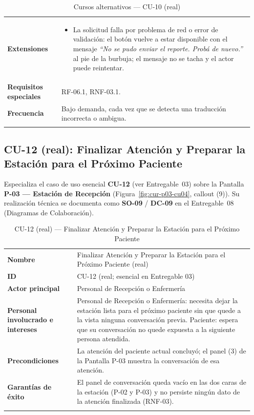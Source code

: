 \begin{longtable}{@{}p{4.1cm} >{\raggedright\arraybackslash}p{11.2cm}@{}}
\toprule
\textbf{Extensiones} &
\begin{itemize}[leftmargin=*, itemsep=2pt]
    \item[2a.] La solicitud falla por problema de red o error de validación:
    el botón vuelve a estar disponible con el mensaje \textit{``No se pudo
    enviar el reporte. Probá de nuevo.''} al pie de la burbuja; el mensaje
    no se tacha y el actor puede reintentar.
\end{itemize} \\
\textbf{Requisitos especiales} & RF-06.1, RNF-03.1. \\
\textbf{Frecuencia} &
Bajo demanda, cada vez que se detecta una traducción incorrecta o
ambigua. \\
\bottomrule
\caption{Cursos alternativos --- CU-10 (real)}
\end{longtable}

\subsection{CU-12 (real): Finalizar Atención y Preparar la Estación para el
Próximo Paciente}

Especializa el caso de uso esencial \textbf{CU-12} (ver Entregable~03) sobre
la Pantalla \textbf{P-03 --- Estación de Recepción}
(Figura~\ref{fig:cur-p03-cu04}, callout (9)). Su realización técnica se
documenta como \textbf{SO-09} / \textbf{DC-09} en el Entregable~08
(Diagramas de Colaboración).

\begin{longtable}{@{}p{4.1cm} >{\raggedright\arraybackslash}p{11.2cm}@{}}
\toprule
\textbf{Nombre} & Finalizar Atención y Preparar la Estación para el Próximo
Paciente (real) \\
\textbf{ID} & CU-12 (real; esencial en Entregable 03) \\
\textbf{Actor principal} & Personal de Recepción o Enfermería \\
\textbf{Personal involucrado e intereses} &
Personal de Recepción o Enfermería: necesita dejar la estación lista para
el próximo paciente sin que quede a la vista ninguna conversación previa.
\newline
Paciente: espera que su conversación no quede expuesta a la siguiente
persona atendida. \\
\textbf{Precondiciones} &
La atención del paciente actual concluyó; el panel (3) de la Pantalla
P-03 muestra la conversación de esa atención. \\
\textbf{Garantías de éxito} &
El panel de conversación queda vacío en las dos caras de la estación
(P-02 y P-03) y no persiste ningún dato de la atención finalizada (RNF-03). \\
\bottomrule
\caption{CU-12 (real) — Finalizar Atención y Preparar la Estación para el
Próximo Paciente}
\end{longtable}

